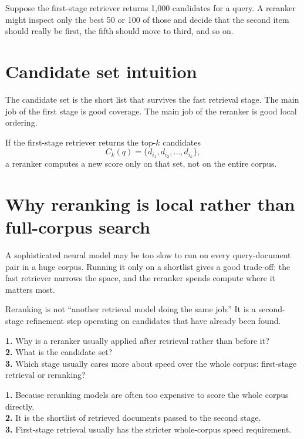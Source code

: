 \documentclass[11pt,oneside]{report}
\begin{document}
\begin{examplebox}
Suppose the first-stage retriever returns 1{,}000 candidates for a query. A reranker might inspect only the best 50 or 100 of those and decide that the second item should really be first, the fifth should move to third, and so on.
\end{examplebox}

\section*{Candidate set intuition}
The candidate set is the short list that survives the fast retrieval stage. The main job of the first stage is good coverage. The main job of the reranker is good local ordering.

\begin{formulabox}
If the first-stage retriever returns the top-$k$ candidates
\[
C_k(q)=\{d_{i_1},d_{i_2},\dots,d_{i_k}\},
\]
a reranker computes a new score only on that set, not on the entire corpus.
\end{formulabox}

\section*{Why reranking is local rather than full-corpus search}
A sophisticated neural model may be too slow to run on every query-document pair in a huge corpus. Running it only on a shortlist gives a good trade-off: the fast retriever narrows the space, and the reranker spends compute where it matters most.

\begin{warningbox}
Reranking is not ``another retrieval model doing the same job.'' It is a second-stage refinement step operating on candidates that have already been found.
\end{warningbox}

\begin{selfcheckbox}
\textbf{1.} Why is a reranker usually applied after retrieval rather than before it?\\
\textbf{2.} What is the candidate set?\\
\textbf{3.} Which stage usually cares more about speed over the whole corpus: first-stage retrieval or reranking?
\end{selfcheckbox}

\begin{answerbox}
\textbf{1.} Because reranking models are often too expensive to score the whole corpus directly.\\
\textbf{2.} It is the shortlist of retrieved documents passed to the second stage.\\
\textbf{3.} First-stage retrieval usually has the stricter whole-corpus speed requirement.
\end{answerbox}
\end{document}
